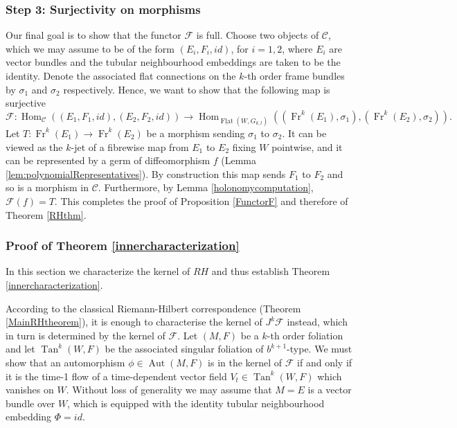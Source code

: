 \documentclass[10pt]{amsart}
\newcommand{\F}{{\mathcal{F}}}
\newcommand{\Hom}{\operatorname{Hom}}
\newcommand{\FlatCat}{{\underline{\operatorname{Flat}}}}
\newcommand{\Tan}{{\operatorname{Tan}}}
\newcommand{\Fr}{{\operatorname{Fr}}}
\DeclareMathOperator{\Aut}{Aut}
\numberwithin{theoremalpha}{section}
\numberwithin{equation}{section}
\numberwithin{definition}{section}
\numberwithin{theorem}{section}
\numberwithin{proposition}{section}
\numberwithin{lemma}{section}
\numberwithin{example}{section}
\numberwithin{remark}{section}
\numberwithin{corollary}{section}
\numberwithin{question}{section}
\numberwithin{problem}{section}
\numberwithin{assumption}{section}
\theoremstyle{named}
\numberwithin{equation}{section}
\begin{document}
\subsubsection{Step 3: Surjectivity on morphisms}

Our final goal is to show that the functor $\F$ is full. Choose two objects of $\mathcal{C}$, which we may assume to be of the form $(E_{i}, F_{i}, id)$, for $i = 1, 2$, where $E_{i}$ are vector bundles and the tubular neighbourhood embeddings are taken to be the identity. Denote the associated flat connections on the $k$-th order frame bundles by $\sigma_{1}$ and $\sigma_{2}$ respectively. Hence, we want to show that the following map is surjective 
\[
\F: \Hom_{\mathcal{C}}((E_{1}, F_{1}, id), (E_{2}, F_{2}, id)) \to \Hom_{ \FlatCat(W, G_{k,l})}((\Fr^{k}(E_{1}), \sigma_{1}), (\Fr^{k}(E_{2}), \sigma_{2})). 
\]
Let $T: \Fr^{k}(E_{1}) \to \Fr^{k}(E_{2})$ be a morphism sending $\sigma_{1}$ to $\sigma_{2}$. It can be viewed as the $k$-jet of a fibrewise map from $E_{1}$ to $E_{2}$ fixing $W$ pointwise, and it can be represented by a germ of diffeomorphism $f$ (Lemma \ref{lem:polynomialRepresentatives}). By construction this map sends $F_{1}$ to $F_{2}$ and so is a morphism in $\mathcal{C}$. Furthermore, by Lemma \ref{holonomycomputation}, $\F(f) = T$. This completes the proof of Proposition \ref{FunctorF} and therefore of Theorem \ref{RHthm}. \hfill\qedsymbol

\subsubsection{Proof of Theorem \ref{innercharacterization}}

In this section we characterize the kernel of $RH$ and thus establish Theorem \ref{innercharacterization}.

According to the classical Riemann-Hilbert correspondence (Theorem \ref{MainRHtheorem}), it is enough to characterise the kernel of $J^k\F$ instead, which in turn is determined by the kernel of $\F$. Let $(M, F)$ be a $k$-th order foliation and let $\Tan^{k}(W,F)$ be the associated singular foliation of $b^{k+1}$-type. We must show that an automorphism $\phi \in \Aut(M,F)$ is in the kernel of $\F$ if and only if it is the time-1 flow of a time-dependent vector field $V_t \in \Tan^{k}(W,F)$ which vanishes on $W$. Without loss of generality we may assume that $M = E$ is a vector bundle over $W$, which is equipped with the identity tubular neighbourhood embedding $\Phi = id$. 
\end{document}
